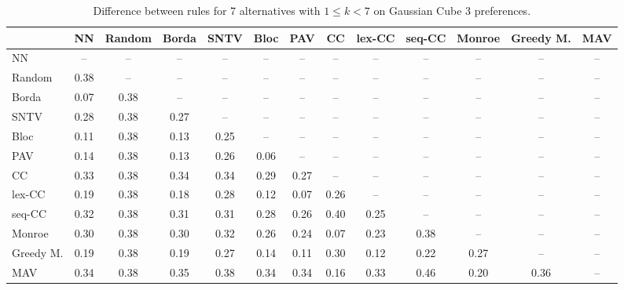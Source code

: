 
\begin{table*}[htbp]
\centering
\begin{tabular}{lcccccccccccc}
\toprule
 & NN & Random & Borda & SNTV & Bloc & PAV & CC & lex-CC & seq-CC & Monroe & Greedy M. & MAV \\
\midrule
NN & -- & -- & -- & -- & -- & -- & -- & -- & -- & -- & -- & -- \\
Random & \cellcolor{blue!38} 0.38 & -- & -- & -- & -- & -- & -- & -- & -- & -- & -- & -- \\
Borda & \cellcolor{blue!7} 0.07 & \cellcolor{blue!38} 0.38 & -- & -- & -- & -- & -- & -- & -- & -- & -- & -- \\
SNTV & \cellcolor{blue!28} 0.28 & \cellcolor{blue!38} 0.38 & \cellcolor{blue!27} 0.27 & -- & -- & -- & -- & -- & -- & -- & -- & -- \\
Bloc & \cellcolor{blue!11} 0.11 & \cellcolor{blue!38} 0.38 & \cellcolor{blue!13} 0.13 & \cellcolor{blue!25} 0.25 & -- & -- & -- & -- & -- & -- & -- & -- \\
PAV & \cellcolor{blue!14} 0.14 & \cellcolor{blue!38} 0.38 & \cellcolor{blue!13} 0.13 & \cellcolor{blue!26} 0.26 & \cellcolor{blue!6} 0.06 & -- & -- & -- & -- & -- & -- & -- \\
CC & \cellcolor{blue!33} 0.33 & \cellcolor{blue!38} 0.38 & \cellcolor{blue!34} 0.34 & \cellcolor{blue!34} 0.34 & \cellcolor{blue!28} 0.29 & \cellcolor{blue!27} 0.27 & -- & -- & -- & -- & -- & -- \\
lex-CC & \cellcolor{blue!19} 0.19 & \cellcolor{blue!38} 0.38 & \cellcolor{blue!18} 0.18 & \cellcolor{blue!28} 0.28 & \cellcolor{blue!12} 0.12 & \cellcolor{blue!7} 0.07 & \cellcolor{blue!26} 0.26 & -- & -- & -- & -- & -- \\
seq-CC & \cellcolor{blue!32} 0.32 & \cellcolor{blue!38} 0.38 & \cellcolor{blue!31} 0.31 & \cellcolor{blue!31} 0.31 & \cellcolor{blue!28} 0.28 & \cellcolor{blue!26} 0.26 & \cellcolor{blue!40} 0.40 & \cellcolor{blue!25} 0.25 & -- & -- & -- & -- \\
Monroe & \cellcolor{blue!30} 0.30 & \cellcolor{blue!38} 0.38 & \cellcolor{blue!30} 0.30 & \cellcolor{blue!32} 0.32 & \cellcolor{blue!26} 0.26 & \cellcolor{blue!24} 0.24 & \cellcolor{blue!7} 0.07 & \cellcolor{blue!23} 0.23 & \cellcolor{blue!38} 0.38 & -- & -- & -- \\
Greedy M. & \cellcolor{blue!19} 0.19 & \cellcolor{blue!38} 0.38 & \cellcolor{blue!19} 0.19 & \cellcolor{blue!27} 0.27 & \cellcolor{blue!14} 0.14 & \cellcolor{blue!11} 0.11 & \cellcolor{blue!30} 0.30 & \cellcolor{blue!12} 0.12 & \cellcolor{blue!22} 0.22 & \cellcolor{blue!27} 0.27 & -- & -- \\
MAV & \cellcolor{blue!34} 0.34 & \cellcolor{blue!38} 0.38 & \cellcolor{blue!35} 0.35 & \cellcolor{blue!38} 0.38 & \cellcolor{blue!34} 0.34 & \cellcolor{blue!34} 0.34 & \cellcolor{blue!16} 0.16 & \cellcolor{blue!33} 0.33 & \cellcolor{blue!46} 0.46 & \cellcolor{blue!20} 0.20 & \cellcolor{blue!36} 0.36 & -- \\
\bottomrule
\end{tabular}

\caption{Difference between rules for 7 alternatives with $1 \leq k < 7$ on Gaussian Cube 3 preferences.}
\label{tab:rule_distance_heatmap-m=[7]-pref_dist=euclidean__args__dimensions=3_-_space=gaussian_cube}
\end{table*}
    